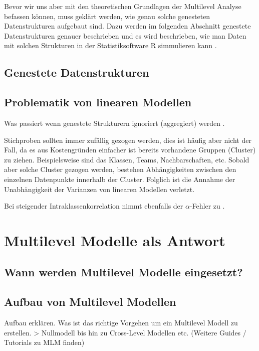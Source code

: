 \documentclass[12pt]{article}\usepackage[]{graphicx}\usepackage[]{color}
\begin{document}

Bevor wir uns aber mit den theoretischen Grundlagen der Multilevel Analyse befassen können, muss geklärt werden, wie genau solche genesteten Datenstrukturen aufgebaut sind. Dazu werden im folgenden Abschnitt genestete Datenstrukturen genauer beschrieben und es wird beschrieben, wie man Daten mit solchen Strukturen in der Statistiksoftware R simmulieren kann \cite{R}.





\subsection{Genestete Datenstrukturen}
\subsection{Problematik von linearen Modellen}
Was passiert wenn genestete Strukturern ignoriert (aggregiert) werden \cite{SnijdersTomA.B2012Ma:a}.

Stichproben sollten immer zufällig gezogen werden, dies ist häufig aber nicht der Fall, da es aus Kostengründen einfacher ist bereits vorhandene Gruppen (Cluster) zu ziehen. Beispielsweise sind das Klassen, Teams, Nachbarschaften, etc. Sobald aber solche Cluster gezogen werden, bestehen Abhängigkeiten zwischen den einzelnen Datenpunkte innerhalb der Cluster. Folglich ist die Annahme der Unabhängigkeit der Varianzen von linearen Modellen verletzt.

Bei steigender Intraklassenkorrelation nimmt ebenfalls der $\alpha$-Fehler zu \cite{dorman2008effect}.

\section{Multilevel Modelle als Antwort}
\subsection{Wann werden Multilevel Modelle eingesetzt?}
\subsection{Aufbau von Multilevel Modellen}
Aufbau erklären. Was ist das richtige Vorgehen um ein Multilevel Modell zu erstellen. > Nullmodell bis hin zu Cross-Level Modellen etc. \cite{SnijdersTomA.B2012Ma:a} (Weitere Guides / Tutorials zu MLM finden)
\end{document}
